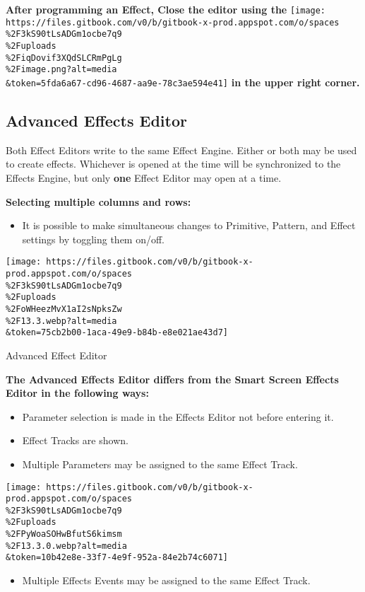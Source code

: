 \documentclass[
]{article}
\providecommand{\tightlist}{%
  \setlength{\itemsep}{0pt}\setlength{\parskip}{0pt}}
\begin{document}
\textbf{After programming an Effect, Close the editor using the} \texttt{[image: https://files.gitbook.com/v0/b/gitbook-x-prod.appspot.com/o/spaces\\\%2F3kS90tLsADGm1ocbe7q9\\\%2Fuploads\\\%2FiqDovif3XQdSLCRmPgLg\\\%2Fimage.png?alt=media\\\&token=5fda6a67-cd96-4687-aa9e-78c3ae594e41]} \textbf{in the upper right corner.}

\hypertarget{advanced-effects-editor}{%
\subsection{Advanced Effects Editor}\label{advanced-effects-editor}}

Both Effect Editors write to the same Effect Engine. Either or both may be used to create effects. Whichever is opened at the time will be synchronized to the Effects Engine, but only \textbf{one} Effect Editor may open at a time.

\textbf{Selecting multiple columns and rows:}

\begin{itemize}
\tightlist
\item
  It is possible to make simultaneous changes to Primitive, Pattern, and Effect settings by toggling them on/off.
\end{itemize}

\texttt{[image: https://files.gitbook.com/v0/b/gitbook-x-prod.appspot.com/o/spaces\\\%2F3kS90tLsADGm1ocbe7q9\\\%2Fuploads\\\%2FoWHeezMvX1aI2sNpksZw\\\%2F13.3.webp?alt=media\\\&token=75cb2b00-1aca-49e9-b84b-e8e021ae43d7]}

Advanced Effect Editor

\textbf{The Advanced Effects Editor differs from the Smart Screen Effects Editor in the following ways:}

\begin{itemize}
\item
  Parameter selection is made in the Effects Editor not before entering it.
\item
  Effect Tracks are shown.
\item
  Multiple Parameters may be assigned to the same Effect Track.
\end{itemize}

\texttt{[image: https://files.gitbook.com/v0/b/gitbook-x-prod.appspot.com/o/spaces\\\%2F3kS90tLsADGm1ocbe7q9\\\%2Fuploads\\\%2FPyWoaSOHwBfutS6kimsm\\\%2F13.3.0.webp?alt=media\\\&token=10b42e8e-33f7-4e9f-952a-84e2b74c6071]}

\begin{itemize}
\tightlist
\item
  Multiple Effects Events may be assigned to the same Effect Track.
\end{itemize}
\end{document}
